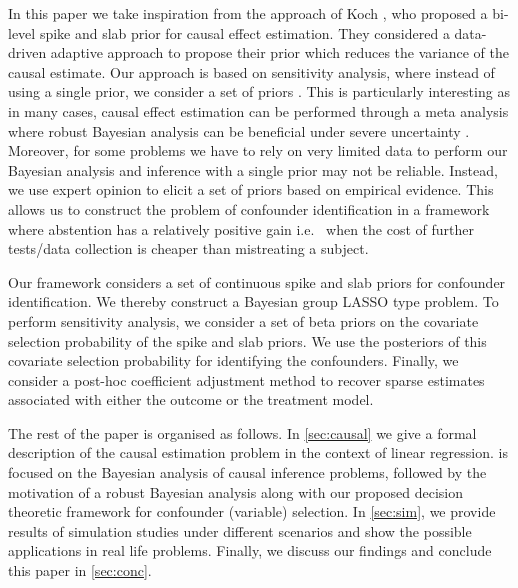 \documentclass[preprint,12pt]{elsarticle}
\begin{document}
In this paper we take inspiration from the approach of Koch \cite{koch2020}, who proposed a bi-level spike and slab prior for causal effect 
estimation. They considered a data-driven adaptive approach to
propose their prior which reduces the variance of the causal estimate. 
Our approach is based on
sensitivity analysis, where instead of using a single prior, 
we consider a set of priors \cite{BERGER1990303}. This is particularly 
interesting as in many cases, causal effect estimation can be performed 
through a meta analysis where robust Bayesian analysis 
can be beneficial under severe uncertainty \cite{raices_cruz22}.
Moreover, for some problems 
we have to rely on very limited data to perform our Bayesian analysis and 
inference with a single prior may not be reliable.
Instead, we use expert opinion to elicit a set of priors 
based on empirical evidence. 
This allows us to construct the problem of confounder identification 
in a framework where abstention has a relatively positive gain i.e.~
when the cost of further tests/data collection is cheaper than
mistreating a subject.

Our framework considers a set of continuous spike and slab priors 
\cite{ishwaran2005} for confounder identification.
We thereby construct a Bayesian group LASSO \cite{xu2015} type problem.
To perform sensitivity analysis,
we consider a set of beta priors on the covariate selection 
probability of the spike and slab priors. We use the posteriors of this
covariate selection probability for identifying the confounders. Finally, 
we consider a post-hoc coefficient adjustment method \cite{hahn2015}
to recover sparse estimates associated with either the outcome or the
treatment model. 

The rest of the paper is organised as follows. In \cref{sec:causal}
we give a formal description of the causal estimation problem in the
context of linear regression.  is focused on the
Bayesian analysis of causal inference problems, followed by the
motivation of a robust Bayesian analysis along with our proposed decision 
theoretic framework for confounder (variable) selection. In \cref{sec:sim}, 
we provide results of simulation studies under different scenarios 
and show the possible applications in real life problems. Finally, 
we discuss our findings and conclude this paper in \cref{sec:conc}.
\end{document}
